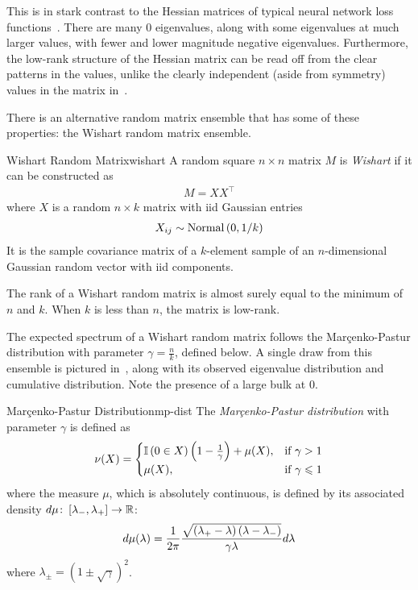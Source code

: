 \documentclass[../../thesis.tex]{subfiles}
\begin{document}
This is in stark contrast to the Hessian matrices
of typical neural network loss functions~\cite{sagun2017}.
There are many $0$ eigenvalues,
along with some eigenvalues at much larger values,
with fewer and lower magnitude negative eigenvalues.
Furthermore, the low-rank structure of the Hessian matrix
can be read off from the clear patterns in the values,
unlike the clearly independent (aside from symmetry) values
in the matrix in~.

There is an alternative random matrix ensemble
that has some of these properties:
the Wishart random matrix ensemble.

\begin{definition}{Wishart Random Matrix}{wishart}
	A random square $n\times n$ matrix $M$ is \emph{Wishart}
	if it can be constructed as
	\begin{align}
		M = XX^\top
	\end{align}
	where $X$ is a random $n \times k$ matrix with
	iid Gaussian entries
	\begin{align}
		X_{ij} \sim \mathrm{Normal}\left(0, 1/k\right)
	\end{align}
	It is the sample covariance matrix of a $k$-element sample
	of an $n$-dimensional Gaussian random vector with
	iid components.
\end{definition}

The rank of a Wishart random matrix is almost surely equal to
the minimum of $n$ and $k$.
When $k$ is less than $n$,
the matrix is low-rank.

The expected spectrum of a Wishart random matrix
follows the Mar{\c c}enko-Pastur distribution
with parameter $\gamma = \frac{n}{k}$,
defined below.
A single draw from this ensemble is pictured
in~,
along with its observed eigenvalue distribution
and cumulative distribution.
Note the presence of a large bulk at $0$.

\begin{definition}{Mar{\c c}enko-Pastur Distribution}{mp-dist}
	The \emph{Mar{\c c}enko-Pastur distribution}
	with parameter $\gamma$ is defined as
	\begin{equation}\equationlabel{def-mp-dist}
		\nu(X) =
			\begin{cases}
				\Ind\left(0 \in X\right)%
					\left(1-\frac{1}{\gamma}\right) + \mu(X),
				& \text{if } \gamma > 1\\
				\mu(X),
				& \text{if } \gamma \leq 1\\
			\end{cases}
	\end{equation}
	where the measure $\mu$,
	which is absolutely continuous, is defined
	by its associated density
	$d\mu\colon\left[\lambda_-, \lambda_+\right]\to\mathbb{R}$:
	\begin{equation}\equationlabel{def-mp-density}
		d\mu(\lambda) = \frac{1}{2\pi}%
		\frac{\sqrt{\left(\lambda_+ - \lambda\right)\left(\lambda-\lambda_-\right)}}%
		{\gamma\lambda} d\lambda
	\end{equation}
	where $\lambda_{\pm} = {\left(1 \pm \sqrt{\gamma}\right)}^2$.
\end{definition}
\end{document}
